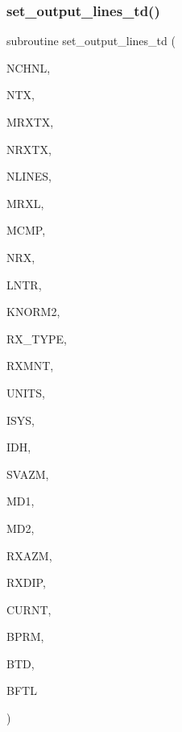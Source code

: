 \subsubsection{\texorpdfstring{set\+\_\+output\+\_\+lines\+\_\+td()}{set\_output\_lines\_td()}}
{\footnotesize\ttfamily subroutine set\+\_\+output\+\_\+lines\+\_\+td (\begin{DoxyParamCaption}\item[{integer}]{N\+C\+H\+NL,  }\item[{integer}]{N\+TX,  }\item[{integer}]{M\+R\+X\+TX,  }\item[{integer, dimension(ntx)}]{N\+R\+X\+TX,  }\item[{integer}]{N\+L\+I\+N\+ES,  }\item[{integer}]{M\+R\+XL,  }\item[{integer}]{M\+C\+MP,  }\item[{integer, dimension(nlines)}]{N\+RX,  }\item[{integer, dimension(4,nlines)}]{L\+N\+TR,  }\item[{integer, dimension(mrxtx,ntx)}]{K\+N\+O\+R\+M2,  }\item[{integer, dimension(nlines)}]{R\+X\+\_\+\+T\+Y\+PE,  }\item[{real, dimension(nlines)}]{R\+X\+M\+NT,  }\item[{integer, dimension(nlines)}]{U\+N\+I\+TS,  }\item[{integer}]{I\+S\+YS,  }\item[{integer, dimension(nlines)}]{I\+DH,  }\item[{real, dimension(nlines)}]{S\+V\+A\+ZM,  }\item[{integer}]{M\+D1,  }\item[{integer}]{M\+D2,  }\item[{real, dimension(md1,md2)}]{R\+X\+A\+ZM,  }\item[{real, dimension(md1,md2)}]{R\+X\+D\+IP,  }\item[{real, dimension(1)}]{C\+U\+R\+NT,  }\item[{real, dimension(mrxtx,ntx)}]{B\+P\+RM,  }\item[{real, dimension(nchnl,mrxtx,ntx,3)}]{B\+TD,  }\item[{real, dimension(nchnl,mrxl,mcmp,nlines)}]{B\+F\+TL }\end{DoxyParamCaption})}


